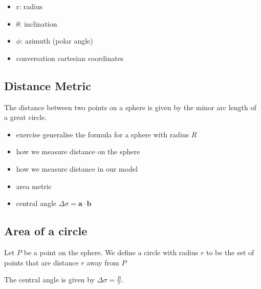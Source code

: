 \begin{itemize}
\tightlist
\item[$\square$]
  r: radius
\item[$\square$]
  \(\theta\): inclination
\item[$\square$]
  \(\phi\): azimuth (polar angle)
\item[$\square$]
  conversation cartesian coordinates
\end{itemize}

\subsection{Distance Metric}\label{distance-metric}

The distance between two points on a sphere is given by the minor arc
length of a great circle.

\begin{itemize}
\tightlist
\item[$\square$]
  exercise generalise the formula for a sphere with radius \(R\)
\item[$\square$]
  how we measure distance on the sphere
\item[$\square$]
  how we measure distance in our model
\item[$\square$]
  area metric
\item[$\square$]
  central angle \(\Delta \sigma = \mathbf a \cdot \mathbf b\)
\end{itemize}

\subsection{Area of a circle}\label{area-of-a-circle}

Let \(P\) be a point on the sphere. We define a circle with radius \(r\)
to be the set of points that are distance \(r\) away from \(P\)

The central angle is given by \(\Delta \sigma = \frac{R}{r}\).
